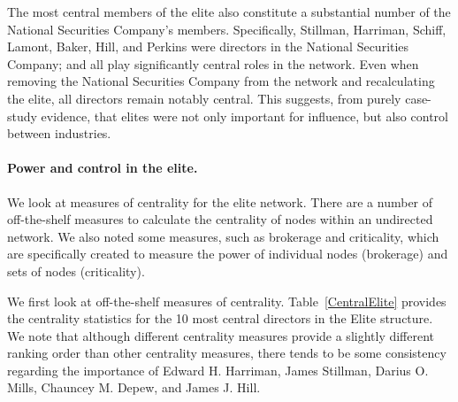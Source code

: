 The most central members of the elite also constitute a substantial number of the National Securities Company's members. Specifically, Stillman, Harriman, Schiff, Lamont, Baker, Hill, and Perkins were directors in the National Securities Company; and all play significantly central roles in the network. Even when removing the National Securities Company from the network and recalculating the elite, all directors remain notably central. This suggests, from purely case-study evidence, that elites were not only important for influence, but also control between industries.

\paragraph{Power and control in the elite.}

We look at measures of centrality for the elite network. There are a number of off-the-shelf measures to calculate the centrality of nodes within an undirected network. We also noted some measures, such as brokerage and criticality, which are specifically created to measure the power of individual nodes (brokerage) and sets of nodes (criticality).

We first look at off-the-shelf measures of centrality. Table~\ref{CentralElite} provides the centrality statistics for the 10 most central directors in the Elite structure. We note that although different centrality measures provide a slightly different ranking order than other centrality measures, there tends to be some consistency regarding the importance of Edward H. Harriman, James Stillman, Darius O. Mills, Chauncey M. Depew, and James J. Hill.

